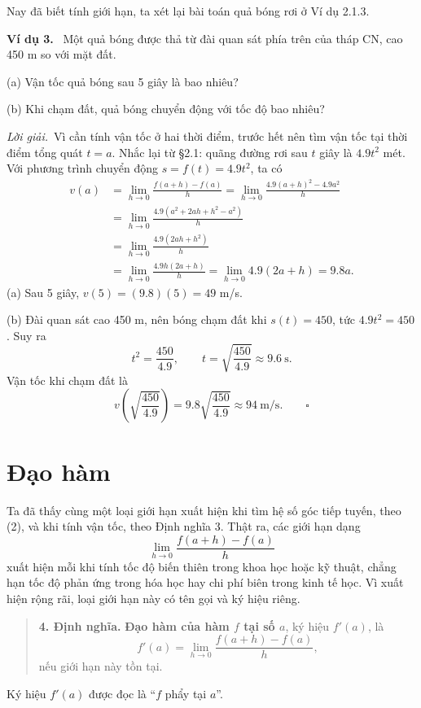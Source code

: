 \documentclass[12pt,a4paper]{article}
\newcommand{\ex}[1]{\par\medskip\noindent\textbf{Ví dụ #1.}\ }
\newcommand{\sol}{\par\nopagebreak[4]\noindent\textit{Lời giải.}\ }
\begin{document}
Nay đã biết tính giới hạn, ta xét lại bài toán quả bóng rơi ở Ví dụ 2.1.3.
\begin{samepage}
\ex{3} Một quả bóng được thả từ đài quan sát phía trên của tháp CN, cao 450 m so với mặt đất.

(a) Vận tốc quả bóng sau 5 giây là bao nhiêu?

(b) Khi chạm đất, quả bóng chuyển động với tốc độ bao nhiêu?
\end{samepage}
\sol Vì cần tính vận tốc ở hai thời điểm, trước hết nên tìm vận tốc tại thời điểm tổng quát $t=a$. Nhắc lại từ §2.1: quãng đường rơi sau $t$ giây là $4.9t^2$ mét. Với phương trình chuyển động $s=f(t)=4.9t^2$, ta có
\begin{align*}
v(a)&=\lim_{h\to0}\frac{f(a+h)-f(a)}h=\lim_{h\to0}\frac{4.9(a+h)^2-4.9a^2}h\\
&=\lim_{h\to0}\frac{4.9(a^2+2ah+h^2-a^2)}h\\
&=\lim_{h\to0}\frac{4.9(2ah+h^2)}h\\
&=\lim_{h\to0}\frac{4.9h(2a+h)}h=\lim_{h\to0}4.9(2a+h)=9.8a.
\end{align*}
(a) Sau 5 giây, $v(5)=(9.8)(5)=49$ m/s.

(b) Đài quan sát cao 450 m, nên bóng chạm đất khi $s(t)=450$, tức $4.9t^2=450$. Suy ra
\[t^2=\frac{450}{4.9},\qquad t=\sqrt{\frac{450}{4.9}}\approx9.6\ \mathrm{s}.\]
Vận tốc khi chạm đất là
\[v\left(\sqrt{\frac{450}{4.9}}\right)=9.8\sqrt{\frac{450}{4.9}}\approx94\ \mathrm{m/s}.\qquad\square\]
\section*{Đạo hàm}
Ta đã thấy cùng một loại giới hạn xuất hiện khi tìm hệ số góc tiếp tuyến, theo (2), và khi tính vận tốc, theo Định nghĩa 3. Thật ra, các giới hạn dạng
\[\lim_{h\to0}\frac{f(a+h)-f(a)}h\]
xuất hiện mỗi khi tính tốc độ biến thiên trong khoa học hoặc kỹ thuật, chẳng hạn tốc độ phản ứng trong hóa học hay chi phí biên trong kinh tế học. Vì xuất hiện rộng rãi, loại giới hạn này có tên gọi và ký hiệu riêng.
\begin{quote}\textbf{4. Định nghĩa.} \textbf{Đạo hàm của hàm $f$ tại số $a$}, ký hiệu $f'(a)$, là
\[f'(a)=\lim_{h\to0}\frac{f(a+h)-f(a)}h,\]
nếu giới hạn này tồn tại.
\end{quote}
Ký hiệu $f'(a)$ được đọc là “$f$ phẩy tại $a$”.
\end{document}
